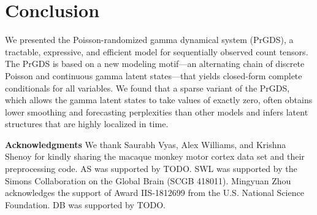 \documentclass{article}
\begin{document}

\section{Conclusion} We presented the Poisson-randomized gamma dynamical system (PrGDS), a tractable, expressive, and efficient model for sequentially observed count tensors. The PrGDS is based on a new modeling motif---an alternating chain of discrete Poisson and continuous gamma latent states---that yields closed-form complete conditionals for all variables. We found that a sparse variant of the PrGDS, which allows the gamma latent states to take values of exactly zero, often obtains lower smoothing and forecasting perplexities than other models and infers latent structures that are highly localized in time.


{\small
  \textbf{Acknowledgments} \;
  We thank Saurabh Vyas, Alex Williams, and Krishna Shenoy for kindly sharing the macaque monkey motor cortex data set and their preprocessing code.  AS was supported by TODO. SWL was supported by the Simons Collaboration on the Global Brain (SCGB 418011).  Mingyuan Zhou acknowledges the support of Award IIS-1812699 from the U.S. National Science Foundation.  DB was supported by TODO.}

\end{document}
